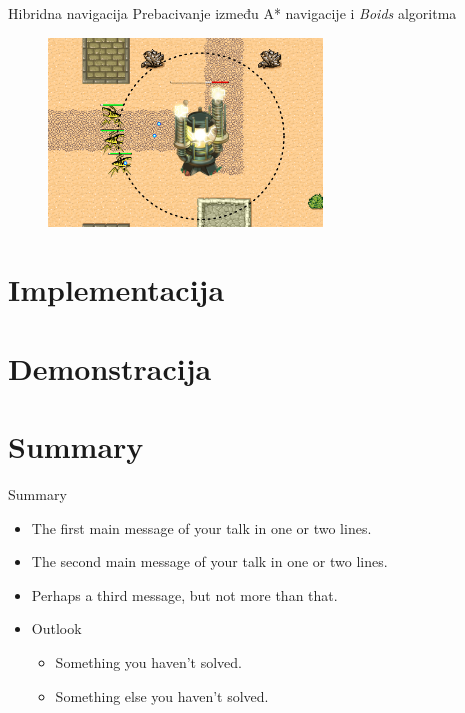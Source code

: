 \documentclass[utf8]{beamer}
\begin{document}
\begin{frame}{Hibridna navigacija}
    Prebacivanje između A* navigacije i \textit{Boids} algoritma
    \begin{figure}[h]
        \centering
        \includegraphics[height=5cm]{images/boidsEnemySeparation.pdf}
    \end{figure}
\end{frame}

\section{Implementacija}



\section{Demonstracija}

\section*{Summary}

\begin{frame}{Summary}
  \begin{itemize}
  \item
    The \alert{first main message} of your talk in one or two lines.
  \item
    The \alert{second main message} of your talk in one or two lines.
  \item
    Perhaps a \alert{third message}, but not more than that.
  \end{itemize}
  
  \begin{itemize}
  \item
    Outlook
    \begin{itemize}
    \item
      Something you haven't solved.
    \item
      Something else you haven't solved.
    \end{itemize}
  \end{itemize}
\end{frame}
\end{document}
